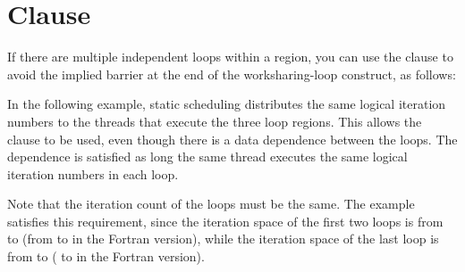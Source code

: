 \section{ Clause}
\label{sec:nowait}

If there are multiple independent loops within a  region, you 
can use the  clause to avoid the implied barrier at the end of
the worksharing-loop construct, as follows:



In the following example, static scheduling distributes the same logical iteration 
numbers to the threads that execute the three loop regions. This allows the  
clause to be used, even though there is a data dependence between the loops. The 
dependence is satisfied as long the same thread executes the same logical iteration 
numbers in each loop.

Note that the iteration count of the loops must be the same. The example satisfies 
this requirement, since the iteration space of the first two loops is from  
to  (from  to  in the Fortran version), while the 
iteration space of the last loop is from  to  ( to 
 in the Fortran version).



